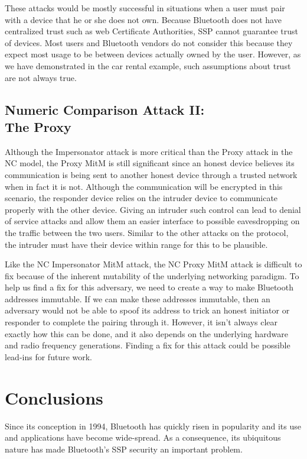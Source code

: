 \documentclass{acm_proc_article-sp}
\begin{document}
These attacks would be mostly successful in situations when a user must pair with a device that he or she does not own. Because Bluetooth does not have centralized trust such as web Certificate Authorities, SSP cannot guarantee trust of devices. Most users and Bluetooth vendors do not consider this because they expect most usage to be between devices actually owned by the user. However, as we have demonstrated in the car rental example, such assumptions about trust are not always true.

\subsection{Numeric Comparison Attack II:\\The Proxy}
Although the Impersonator attack is more critical than the Proxy attack in the NC model, the Proxy MitM is still significant since an honest device believes its communication is being sent to another honest device through a trusted network when in fact it is not. Although the communication will be encrypted in this scenario, the responder device relies on the intruder device to communicate properly with the other device. Giving an intruder such control can lead to denial of service attacks and allow them an easier interface to possible eavesdropping on the traffic between the two users. Similar to the other attacks on the protocol, the intruder must have their device within range for this to be plausible.

Like the NC Impersonator MitM attack, the NC Proxy MitM attack is difficult to fix because of the inherent mutability of the underlying networking paradigm. To help us find a fix for this adversary, we need to create a way to make Bluetooth addresses immutable. If we can make these addresses immutable, then an adversary would not be able to spoof its address to trick an honest initiator or responder to complete the pairing through it. However, it isn't always clear exactly how this can be done, and it also depends on the underlying hardware and radio frequency generations. Finding a fix for this attack could be possible lead-ins for future work.

\section{Conclusions}

Since its conception in 1994, Bluetooth has quickly risen in popularity and its use and applications have become wide-spread. As a consequence, its ubiquitous nature has made Bluetooth's SSP security an important problem.
\end{document}
